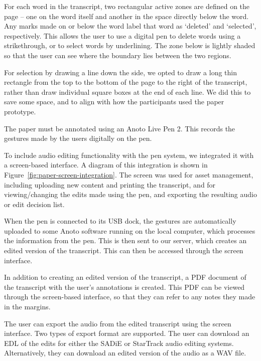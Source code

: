 For each word in the transcript, two rectangular active zones are defined on the page -- one on the word itself and
another in the space directly below the word.  Any marks made on or below the word label that word as `deleted' and
`selected', respectively.  This allows the user to use a digital pen to delete words using a strikethrough, or to
select words by underlining.  The zone below is lightly shaded so that the user can see where the boundary lies between
the two regions.

For selection by drawing a line down the side, we opted to draw a long thin rectangle from the top to the bottom of the
page to the right of the transcript, rather than draw individual square boxes at the end of each line. We did this to
save some space, and to align with how the participants used the paper prototype.

The paper must be annotated using an Anoto Live Pen 2. This records the gestures made by the users digitally on the
pen.

To include audio editing functionality with the pen system, we integrated it with a screen-based interface. A diagram
of this integration is shown in Figure~\ref{fig:paper-screen-integration}. The screen
was used for asset management, including uploading new content and printing the transcript, and for viewing/changing
the edits made using the pen, and exporting the resulting audio or edit decision list.

When the pen is connected to its USB dock, the gestures are automatically uploaded to some Anoto software running
on the local computer, which processes the information from the pen. This is then sent to our server, which creates an
edited version of the transcript. This can then be accessed through the screen interface.

In addition to creating an edited version of the transcript, a PDF document of the transcript with the user's
annotations is created. This PDF can be viewed through the screen-based interface, so that they can refer to any notes
they made in the margins.

The user can export the audio from the edited transcript using the screen interface. Two types of export format are
supported. The user can download an EDL of the edits for either the SADiE or StarTrack audio editing systems.
Alternatively, they can download an edited version of the audio as a WAV file.

